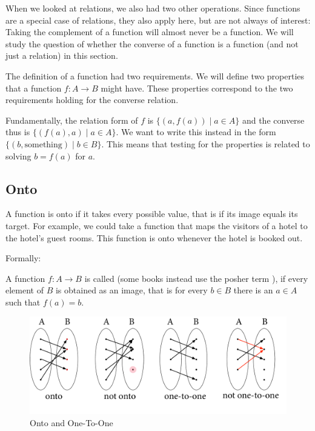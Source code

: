 When we looked at relations, we also had two other operations. Since functions are a
special case of relations, they also apply here, but are not always of interest: 
Taking the complement of a function will almost never be a function. We will study the
question of whether the converse of a function is a function (and not just a relation)
in this section.
\medskip

The definition of a function had two requirements. We will define two properties that a
function $f\colon A\to B$ might have. These properties correspond to the two requirements holding for the converse relation.

Fundamentally, the relation form of $f$ is $\{(a,f(a))\mid a\in A\}$ and the converse
thus is $\{(f(a),a)\mid a\in A\}$. We want to write this instead in
the form $\{(b,\mbox{something})\mid b\in B\}$. This means that testing for the properties
is related to solving $b=f(a)$ for $a$.

\subsection{Onto}

A function is onto if it takes every possible value, that is if its image
equals its target.
For example, we could take a function that maps the visitors of a hotel to
the hotel's guest rooms. This function is onto whenever the hotel is booked
out.

Formally:
\begin{defn}
A function $f\colon A\to B$ is called  (some books instead use the posher
term ), if every element of $B$ is obtained as an image, that is for every $b\in B$ there is an $a\in A$ such that $f(a)=b$.
\end{defn}

\begin{figure}[t]
\begin{center}
\includegraphics[width=\the\textwidth]{pic/OntoPics.pdf}
\caption{Onto and One-To-One}
\label{figoneonto}
\end{center}
\end{figure}

